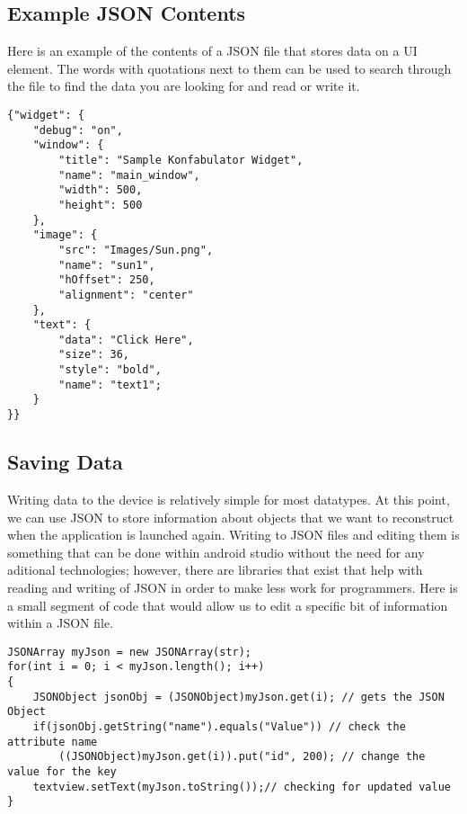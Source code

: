 \documentclass[onecolumn, draftclsnofoot,10pt, compsoc, tikz]{IEEEtran}
\begin{document}
\subsection{Example JSON Contents}
Here is an example of the contents of a JSON file that stores data on a UI element. 
The words with quotations next to them can be used to search through the file to find the data you are looking for and read or write it.
\begin{lstlisting}
{"widget": {
    "debug": "on",
    "window": {
        "title": "Sample Konfabulator Widget",
        "name": "main_window",
        "width": 500,
        "height": 500
    },
    "image": { 
        "src": "Images/Sun.png",
        "name": "sun1",
        "hOffset": 250,
        "alignment": "center"
    },
    "text": {
        "data": "Click Here",
        "size": 36,
        "style": "bold",
        "name": "text1";
    }
}}   

\end{lstlisting}

\subsection{Saving Data}
Writing data to the device is relatively simple for most datatypes. At this point, we can use JSON to store information about objects that we want to reconstruct when the application is launched again. Writing to JSON files and editing them is something that can be done within android studio without the need for any aditional technologies; however, there are libraries that exist that help with reading and writing of JSON in order to make less work for programmers. Here is a small segment of code that would allow us to edit a specific bit of information within a JSON file. 
\begin{lstlisting}
JSONArray myJson = new JSONArray(str);
for(int i = 0; i < myJson.length(); i++)
{
    JSONObject jsonObj = (JSONObject)myJson.get(i); // gets the JSON Object
    if(jsonObj.getString("name").equals("Value")) // check the attribute name
        ((JSONObject)myJson.get(i)).put("id", 200); // change the value for the key
    textview.setText(myJson.toString());// checking for updated value
}
\end{lstlisting}

\clearpage
\end{document}
